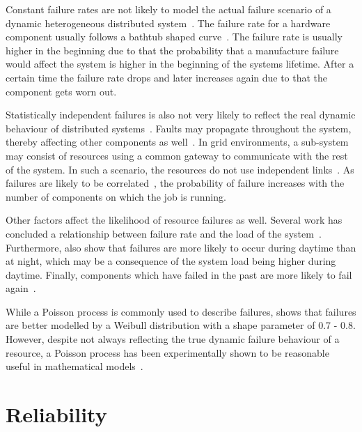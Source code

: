 \documentclass{cslthse-msc}
\begin{document}
Constant failure rates are not likely to model the actual failure scenario of a dynamic heterogeneous distributed system~\cite{algoMinExTime}. The failure rate for a hardware component usually follows a bathtub shaped curve~\cite{surveyReliabilityDistr}. The failure rate is usually higher in the beginning due to that the probability that a manufacture failure would affect the system is higher in the beginning of the systems lifetime. After a certain time the failure rate drops and later increases again due to that the component gets worn out.

Statistically independent failures is also not very likely to reflect the real dynamic behaviour of distributed systems~\cite{surveyReliabilityDistr, cloudServiceRel}. Faults may propagate throughout the system, thereby affecting other components as well~\cite{relGridSystems}. In grid environments, a sub-system may consist of resources using a common gateway to communicate with the rest of the system. In such a scenario, the resources do not use independent links~\cite{optResourceAllMaxPerformance}. As failures are likely to be correlated~\cite{perfImplPerCheckPoint}, the probability of failure increases with the number of components on which the job is running.

Other factors affect the likelihood of resource failures as well. Several work has concluded a relationship between failure rate and the load of the system~\cite{studyOfFailures, implicationsOfFailures}. Furthermore, \cite{studyOfFailures, implicationsOfFailures} also show that failures are more likely to occur during daytime than at night, which may be a consequence of the system load being higher during daytime. Finally, components which have failed in the past are more likely to fail again~\cite{implicationsOfFailures}.

While a Poisson process is commonly used to describe failures, \cite{studyOfFailures} shows that failures are better modelled by a Weibull distribution with a shape parameter of 0.7 - 0.8. However, despite not always reflecting the true dynamic failure behaviour of a resource, a Poisson process has been experimentally shown to be reasonable useful in mathematical models~\cite{experimentalFailureAssessment}.

\section{Reliability} \label{sec:background_reliability}
\end{document}
